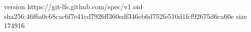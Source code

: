 version https://git-lfs.github.com/spec/v1
oid sha256:46f6a0c68cac6f7e41cd7926ff360edf346eb6d752fe510d1fcf92675d6ca60e
size 174916
